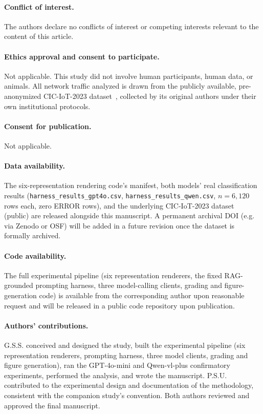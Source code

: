 \documentclass[twocolumn]{svjour3}
\begin{document}
\paragraph{Conflict of interest.} The authors declare no conflicts of interest or competing
interests relevant to the content of this article.

\paragraph{Ethics approval and consent to participate.} Not applicable. This study did not involve
human participants, human data, or animals. All network traffic analyzed is drawn from the publicly
available, pre-anonymized CIC-IoT-2023 dataset~\cite{cic-iot-2023}, collected by its original
authors under their own institutional protocols.

\paragraph{Consent for publication.} Not applicable.

\paragraph{Data availability.} The six-representation rendering code's manifest, both models' real
classification results (\texttt{harness\_results\_gpt4o.csv}, \texttt{harness\_results\_qwen.csv},
$n=6{,}120$ rows each, zero ERROR rows), and the underlying CIC-IoT-2023 dataset~\cite{cic-iot-2023}
(public) are released alongside this manuscript. A permanent archival DOI (e.g. via Zenodo or OSF)
will be added in a future revision once the dataset is formally archived.

\paragraph{Code availability.} The full experimental pipeline (six representation renderers, the
fixed RAG-grounded prompting harness, three model-calling clients, grading and figure-generation
code) is available from the corresponding author upon reasonable request and will be released in a
public code repository upon publication.

\paragraph{Authors' contributions.} G.S.S. conceived and designed the study, built the experimental
pipeline (six representation renderers, prompting harness, three model clients, grading and figure
generation), ran the GPT-4o-mini and Qwen-vl-plus confirmatory experiments, performed the analysis,
and wrote the manuscript. P.S.U. contributed to the experimental design and documentation of the
methodology, consistent with the companion study's convention. Both authors reviewed and approved
the final manuscript.
\end{document}
